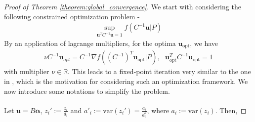 \documentclass[letterpaper]{article}
\newcommand{\ba}[1]{\begin{align}#1\end{align}}
\newcommand{\bas}[1]{\begin{align*}#1\end{align*}}
\newcommand{\bu}{\pmb{u}}
\newcommand{\balpha}{\pmb{\alpha}}
\newcommand{\bx}{\pmb{x}}
\newcommand{\bvar}{\pmb{a}}
\newcommand{\var}{\text{var}}
\newcommand{\bb}[1]{\left(#1\right)}
\DeclareMathOperator{\diag}{diag}
\begin{document}
\begin{proof}[Proof of Theorem \ref{theorem:global_convergence}] We start with considering the following constrained optimization problem - 
\bas{
    \sup_{\bu^TC^{-1}\bu=1}f\bb{C^{-1}\bu|P}%
}
By an application of lagrange multipliers, for the optima $\bu_{\text{opt}}$, we have
\bas{
    \nu C^{-1}\bu_{opt} = C^{-1}\nabla f\bb{(C^{-1})^T\bu_{\text{opt}}|P}, \ \ \ \bu_{\text{opt}}^TC^{-1}\bu_{\text{opt}} = 1
}
with multiplier $\nu \in \mathbb{R}$. This leads to a fixed-point iteration very similar to the one in \cite{NIPS2015_89f03f7d}, which is the motivation for considering such an optimization framework. We now introduce some notations to simplify the problem.
\\ \\ 
Let $\bu = B\balpha$, $z_i' := \frac{z_i}{d_i}$ and $a'_i := \var(z_i') = \frac{a_i}{d_i^2}$, where $a_i := \var(z_i)$. Then,

\end{proof}
\end{document}
